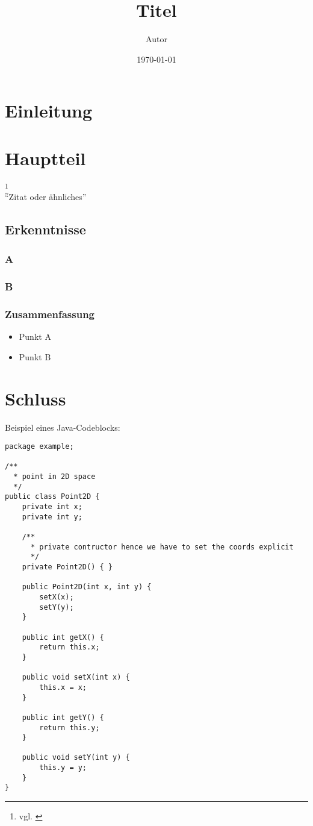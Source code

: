 \documentclass[a4paper,oneside,11pt,bibtotoc,bibliography=openstyle]{scrartcl}
\title{Titel}
\author{Autor}
\date{\today}
\begin{document}
\clearpage
\maketitle
\thispagestyle{empty}

\newpage
\tableofcontents

\newpage
\section{Einleitung}
\blindtext

\section{Hauptteil}
\blindtext\footnote{vgl. \cite{heise}}\\
\enquote{Zitat oder ähnliches}

\subsection{Erkenntnisse}

\subsubsection{A}

\subsubsection{B}

\subsubsection{Zusammenfassung}
\begin{itemize}
    \item Punkt A
    \item Punkt B
\end{itemize}

\section{Schluss}

Beispiel eines Java-Codeblocks:

\begin{verbatim}
package example;

/**
  * point in 2D space
  */
public class Point2D {
    private int x;
    private int y;

    /**
      * private contructor hence we have to set the coords explicit
      */
    private Point2D() { }

    public Point2D(int x, int y) {
        setX(x);
        setY(y);
    }

    public int getX() {
        return this.x;
    }

    public void setX(int x) {
        this.x = x;
    }

    public int getY() {
        return this.y;
    }

    public void setY(int y) {
        this.y = y;
    }
}
\end{verbatim}
\end{document}

